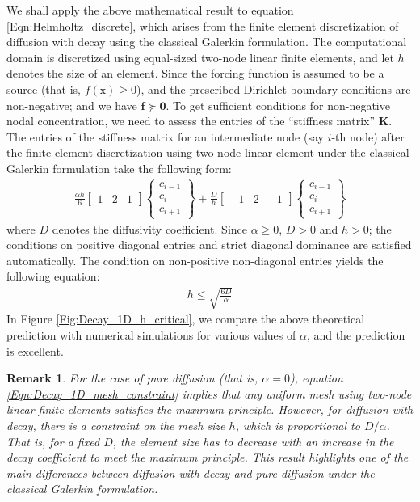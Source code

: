 \documentclass[11pt]{amsart}
\newtheorem{remark}[theorem]{Remark}
\begin{document}
We shall apply the above mathematical result to equation \eqref{Eqn:Helmholtz_discrete}, 
which arises from the finite element discretization of diffusion with decay using the classical 
Galerkin formulation. The computational domain is discretized using equal-sized two-node 
linear finite elements, and let $h$ denotes the size of an element. Since the forcing function 
is assumed to be a source (that is, $f(\mathrm{x}) \geq 0$), and the prescribed Dirichlet 
boundary conditions are non-negative; and we have $\boldsymbol{f} \succeq \boldsymbol{0}$. 
To get sufficient conditions for non-negative nodal concentration, we need to assess the entries 
of the ``stiffness matrix'' $\boldsymbol{K}$.  The entries of the stiffness matrix for an intermediate 
node (say $i$-th node) after the finite element discretization using two-node linear element under 
the classical Galerkin formulation take the following form:
\begin{align}
  \frac{\alpha h}{6}
  \left[\begin{array}{lll} 
      1 & 2 & 1 
    \end{array} \right] 
\left\{\begin{array}{c}
      c_{i-1} \\
      c_{i} \\
      c_{i+1}
    \end{array}\right\}
+ \frac{D}{h}
  \left[\begin{array}{lll} 
      -1 & 2 & -1 
    \end{array} \right] 
\left\{\begin{array}{c}
      c_{i-1} \\
      c_{i} \\
      c_{i+1}
    \end{array}\right\}
\end{align}
where $D$ denotes the diffusivity coefficient. Since $\alpha \geq 0$, $D > 0$ and 
$h > 0$; the conditions on positive diagonal entries and strict diagonal dominance 
are satisfied automatically. The condition on non-positive non-diagonal entries 
yields the following equation:
\begin{align}
  \label{Eqn:Decay_1D_mesh_constraint}
  h \leq \sqrt{\frac{6 D}{\alpha}}
\end{align}
In Figure \ref{Fig:Decay_1D_h_critical}, we compare the above theoretical prediction with 
numerical simulations for various values of $\alpha$, and the prediction is excellent.

\begin{remark}
  For the case of pure diffusion (that is, $\alpha = 0$), equation \eqref{Eqn:Decay_1D_mesh_constraint} 
  implies that any uniform mesh using two-node linear finite elements satisfies the maximum principle. 
  However, for diffusion with decay, there is a constraint on the mesh size $h$, which is proportional to 
  $D/\alpha$. That is, for a fixed $D$, the element size has to decrease with an increase in the decay 
  coefficient to meet the maximum principle. This result highlights one of the main differences between 
  diffusion with decay and pure diffusion under the classical Galerkin formulation.
\end{remark}
\end{document}
